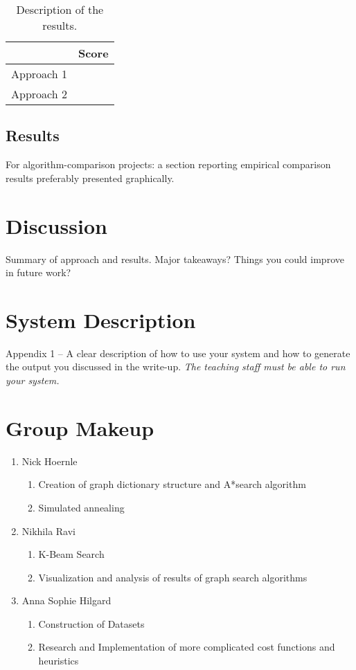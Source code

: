 \documentclass[11pt]{article}
\begin{document}
\begin{table}
  \centering
  \begin{tabular}{ll}
    \toprule
    & Score \\
    \midrule
    Approach 1 & \\
    Approach 2 & \\
    \bottomrule
  \end{tabular}
  \caption{Description of the results.}
\end{table}


\subsection{Results}

 For algorithm-comparison projects: a section reporting empirical comparison results preferably presented graphically.


\section{Discussion}

Summary of approach and results. Major takeaways? Things you could improve in future work?

\appendix

\section{System Description}

 Appendix 1 – A clear description of how to use your system and how to generate the output you discussed in the write-up. \emph{The teaching staff must be able to run your system.}

\section{Group Makeup}

\begin{enumerate}
\item Nick Hoernle
\begin{enumerate}
\item Creation of graph dictionary structure and A*search algorithm
\item Simulated annealing
\end{enumerate}
\item Nikhila Ravi
\begin{enumerate}
\item K-Beam Search
\item Visualization and analysis of results of graph search algorithms
\end{enumerate}
\item Anna Sophie Hilgard
\begin{enumerate}
\item Construction of Datasets
\item Research and Implementation of more complicated cost functions and heuristics
\end{enumerate}
\end{enumerate}


 

\end{document}
